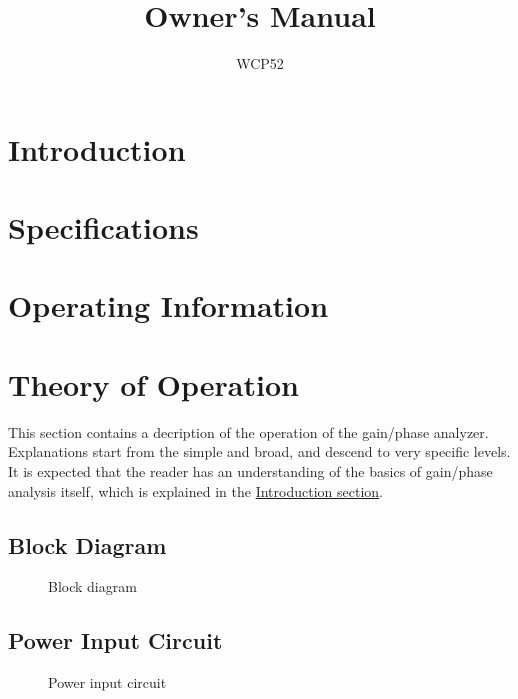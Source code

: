 \documentclass{article}
\title{Owner's Manual}
\author{WCP52}
\begin{document}
\maketitle
\thispagestyle{empty}

\tableofcontents
\setlength{\parskip}{4mm}

\newpage
\section{Introduction}
\label{sec:intro}

\newpage
\section{Specifications}

\newpage
\section{Operating Information}

\newpage
\section{Theory of Operation}

This section contains a decription of the operation of the gain/phase analyzer.
Explanations start from the simple and broad, and descend to very specific
levels. It is expected that the reader has an understanding of the basics of
gain/phase analysis itself, which is explained in the \hyperref[sec:intro]{Introduction
section}.

\subsection{Block Diagram}

\begin{figure}[h]
\centering
{}
\caption{Block diagram}
\label{fig:blockdiagram}
\end{figure}

\subsection{Power Input Circuit}

\begin{figure}[h]
\centering
{}
\caption{Power input circuit}
\label{fig:powerinput}
\end{figure}
\end{document}
